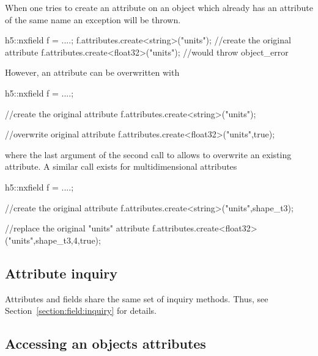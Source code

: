 When one tries to create an attribute on an object which already has an
attribute of the same name an  exception will be thrown. 
\begin{cppcode}
h5::nxfield f = ....;
f.attributes.create<string>("units"); //create the original attribute
f.attributes.create<float32>("units"); //would throw object_error
\end{cppcode}
However, an attribute can be overwritten with 
\begin{cppcode}
h5::nxfield f = ....;

//create the original attribute
f.attributes.create<string>("units"); 

//overwrite original attribute
f.attributes.create<float32>("units",true); 
\end{cppcode}
where the last argument of the second call to  allows to 
overwrite an existing attribute. A similar call exists for multidimensional 
attributes
\begin{cppcode}
h5::nxfield f = ....;

//create the original attribute
f.attributes.create<string>("units",shape_t{3});       

//replace the original "units" attribute
f.attributes.create<float32>("units",shape_t{3,4},true); 
\end{cppcode}

\subsection{Attribute inquiry}

Attributes and fields share the same set of inquiry methods. Thus, see 
Section~\ref{section:field:inquiry} for details.

\subsection{Accessing an objects attributes}


